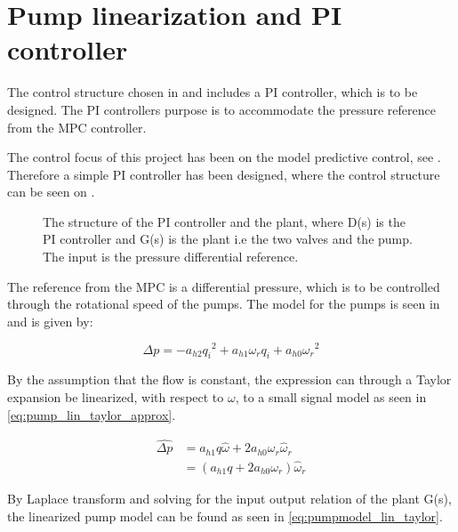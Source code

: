 \chapter{Pump linearization and PI controller}
\label{cha:linear_pump2}

The control structure chosen in  and  includes a PI controller, which is to be designed. The PI controllers purpose is to accommodate the pressure reference from the MPC controller. 

The control focus of this project has been on the model predictive control, see . Therefore a simple PI controller has been designed, where the control structure can be seen on .

\begin{figure}[H]
\centering
  
\caption{The structure of the PI controller and the plant, where D(s) is the PI controller and G(s) is the plant i.e the two valves and the pump. The input is the pressure differential reference.}
\label{fig:simple_PI}
\end{figure}

The reference from the MPC is a differential pressure, which is to be controlled through the rotational speed of the pumps. The model for the pumps is seen in  and is given by:

\begin{equation*}
\Delta p = -a_{h2}{q_i}^2 + a_{h1} \omega_r q_i + a_{h0}{\omega_r}^2
\end{equation*}

By the assumption that the flow is constant, the expression can through a Taylor expansion be linearized, with respect to $\omega$, to a small signal model as seen in \eqref{eq:pump_lin_taylor_approx}.


\begin{equation}
	\begin{split}
		\hat{\Delta p} &= a_{h1}q\hat{\omega} + 2a_{h0}{\omega_r}\hat{\omega}_r\\
					   &= (a_{h1}q + 2a_{h0}{\omega_r}) \hat{\omega}_r
	\end{split}
	\label{eq:pump_lin_taylor_approx}
\end{equation}

By Laplace transform and solving for the input output relation of the plant G(s), the linearized pump model can be found as seen in \eqref{eq:pumpmodel_lin_taylor}.

